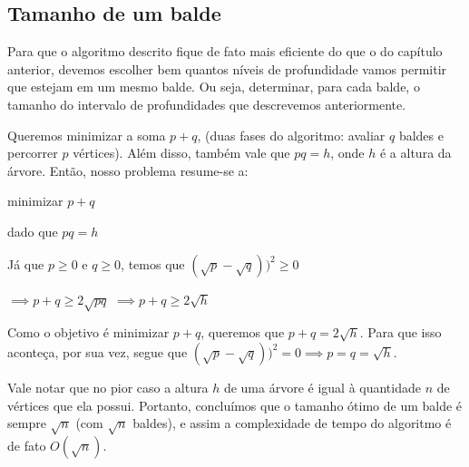 \subsection{Tamanho de um balde}

Para que o algoritmo descrito fique de fato mais eficiente do que o do capítulo anterior, devemos escolher bem quantos níveis de profundidade vamos permitir que estejam em um mesmo balde. Ou seja, determinar, para cada balde, o tamanho do intervalo de profundidades que descrevemos anteriormente.

Queremos minimizar a soma $p + q$, (duas fases do algoritmo: avaliar $q$ baldes e percorrer $p$ vértices). Além disso, também vale que $pq = h$, onde $h$ é a altura da árvore. Então, nosso problema resume-se a:

\centerline{minimizar $p + q$}
\centerline{dado que $pq = h$}

\hspace{1cm}

Já que $p \geq 0$ e $q \geq 0$, temos que $(\sqrt{p} - \sqrt{q}))^2 \geq 0$

$\implies p + q \geq 2\sqrt{pq}$
$\implies p + q \geq 2\sqrt{h}$

\hspace{1cm}

Como o objetivo é minimizar $p + q$, queremos que $p + q = 2\sqrt{h}$. Para que isso aconteça, por sua vez, segue que $(\sqrt{p} - \sqrt{q}))^2 = 0 \implies p = q = \sqrt{h}$.

\hspace{1cm}

Vale notar que no pior caso a altura $h$ de uma árvore é igual à quantidade $n$ de vértices que ela possui. Portanto, concluímos que o tamanho ótimo de um balde é sempre $\sqrt{n}$ (com $\sqrt{n}$ baldes), e assim a complexidade de tempo do algoritmo é de fato $O(\sqrt{n})$.

